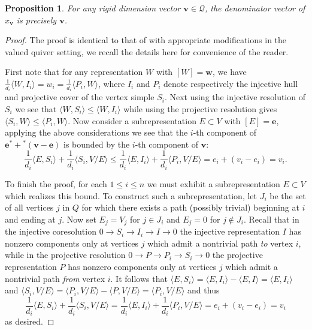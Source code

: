 \documentclass[12pt]{amsart}
\newtheorem{proposition}[theorem]{Proposition}
\newcommand{\bfe}{\mathbf{e}}
\newcommand{\bfv}{\mathbf{v}}
\newcommand{\bfw}{\mathbf{w}}
\newcommand{\cQ}{\mathcal{Q}}
\begin{document}
   \begin{proposition}
    \label{prop:denominators}
    For any rigid dimension vector $\bfv\in\cQ$, the denominator vector of $x_\bfv$ is precisely  $\bfv$.
  \end{proposition}
  \begin{proof}
    The proof is identical to that of \cite[Sec. 4, Cor. 2]{caldero-keller} with appropriate modifications in the valued quiver setting, we recall the details here for convenience of the reader.  

    First note that for any representation $W$ with $[W]=\bfw$, we have $\frac{1}{d_i}\langle W,I_i\rangle=w_i=\frac{1}{d_i}\langle P_i,W\rangle$, where $I_i$ and $P_i$ denote respectively the injective hull and projective cover of the vertex simple $S_i$.
    Next using the injective resolution of $S_i$ we see that $\langle W,S_i\rangle\le\langle W,I_i\rangle$ while using the projective resolution gives $\langle S_i,W\rangle\le\langle P_i,W\rangle$.  Now consider a subrepresentation $E\subset V$ with $[E]=\bfe$, applying the above considerations we see that the $i$-th component of $\bfe^*+{}^*(\bfv-\bfe)$ is bounded by the $i$-th component of $\bfv$:
    \[\frac{1}{d_i}\langle E,S_i\rangle+\frac{1}{d_i}\langle S_i,V/E\rangle\le\frac{1}{d_i}\langle E,I_i\rangle+\frac{1}{d_i}\langle P_i,V/E\rangle=e_i+(v_i-e_i)=v_i.\]

    To finish the proof, for each $1\le i\le n$ we must exhibit a subrepresentation $E\subset V$ which realizes this bound.  
    To construct such a subrepresentation, let $J_i$ be the set of all vertices $j$ in $Q$ for which there exists a path (possibly trivial) beginning at $i$ and ending at $j$.  
    Now set $E_j=V_j$ for $j\in J_i$ and $E_j=0$ for $j\notin J_i$.  
    Recall that in the injective coresolution $0\longrightarrow S_i\longrightarrow I_i\longrightarrow I\longrightarrow 0$ the injective representation $I$ has nonzero components only at vertices $j$ which admit a nontrivial path \emph{to} vertex $i$, while in the projective resolution $0\longrightarrow P\longrightarrow P_i\longrightarrow S_i\longrightarrow 0$ the projective representation $P$ has nonzero components only at vertices $j$ which admit a nontrivial path \emph{from} vertex $i$.  
    It follows that $\langle E,S_i\rangle=\langle E,I_i\rangle-\langle E,I\rangle=\langle E,I_i\rangle$ and $\langle S_i,V/E\rangle=\langle P_i,V/E\rangle-\langle P,V/E\rangle=\langle P_i,V/E\rangle$ and thus 
    \[\frac{1}{d_i}\langle E,S_i\rangle+\frac{1}{d_i}\langle S_i,V/E\rangle=\frac{1}{d_i}\langle E,I_i\rangle+\frac{1}{d_i}\langle P_i,V/E\rangle=e_i+(v_i-e_i)=v_i\]
    as desired.
  \end{proof}
\end{document}

